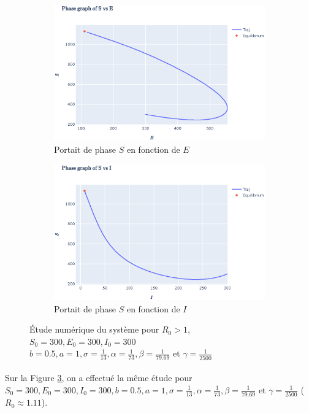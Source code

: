 \documentclass[11pt]{article}
\begin{document}
\begin{figure}[th]
\begin{subfigure}{0.49\textwidth}
	  \includegraphics[width=\linewidth]{../figures/numerical_study_R0_gt1_3.eps}  
	  \caption{Portait de phase $S$ en fonction de $E$}
	  \label{fig:numerical study r0 gt 1 c}
	\end{subfigure}
	\begin{subfigure}{0.49\textwidth}
	  \centering
	  \includegraphics[width=\linewidth]{../figures/numerical_study_R0_gt1_4.eps}  
	  \caption{Portait de phase $S$ en fonction de $I$}
	  \label{fig:numerical study r0 gt 1 d}
	\end{subfigure}
	\centering
	\caption{\'Etude num\'erique du syst\`eme pour $R_0 > 1$, $S_0 = 300, E_0 = 300, I_0 = 300$ \\
	$b =0.5, a = 1, \sigma = \frac{1}{13}, \alpha = \frac{1}{73}, \beta = \frac{1}{79.69}$ et $\gamma = \frac{1}{2500}$
	}
	\label{fig:numerical study r0 gt 1}
\end{figure}
\paragraph{}
Sur la Figure \ref{fig:numerical study r0 gt 1}, on a effectu\'e la m\^eme \'etude pour $S_0 = 300, E_0 = 300, I_0 = 300, b =0.5, a = 1, \sigma = \frac{1}{13}, \alpha = \frac{1}{73}, \beta = \frac{1}{79.69}$ et $\gamma = \frac{1}{2500}$ ($R_0 \approx 1.11$). 
\end{document}
